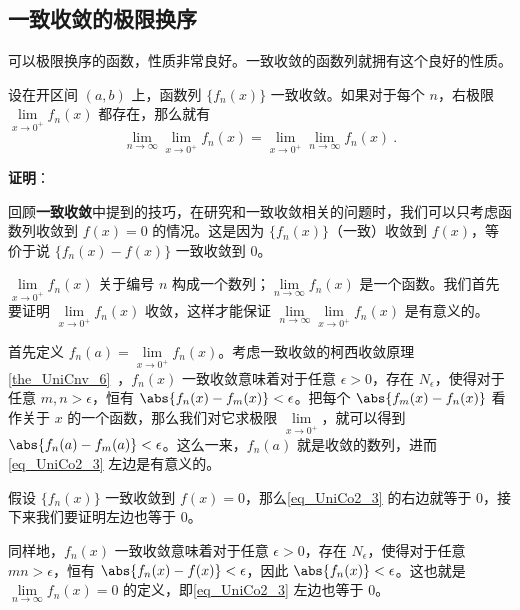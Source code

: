 \subsection{一致收敛的极限换序}

可以极限换序的函数，性质非常良好。一致收敛的函数列就拥有这个良好的性质。

\begin{theorem}{}\label{the_UniCo2_1}
设在开区间 $(a, b)$ 上，函数列 $\{f_n(x)\}$ 一致收敛。如果对于每个 $n$，右极限 $\lim\limits_{x\to 0^+}f_n(x)$ 都存在，那么就有
\begin{equation}\label{eq_UniCo2_3}
\lim\limits_{n\to\infty}\lim\limits_{x\to 0^+}f_n(x)=\lim\limits_{x\to 0^+}\lim\limits_{n\to\infty}f_n(x)~.
\end{equation}
\end{theorem}

\textbf{证明}：

回顾\textbf{一致收敛}中提到的技巧，在研究和一致收敛相关的问题时，我们可以只考虑函数列收敛到 $f(x)=0$ 的情况。这是因为 $\{f_n(x)\}$（一致）收敛到 $f(x)$，等价于说 $\{f_n(x)-f(x)\}$ 一致收敛到 $0$。

$\lim\limits_{x\to 0^+}f_n(x)$ 关于编号 $n$ 构成一个数列；$\lim\limits_{n\to\infty}f_n(x)$ 是一个函数。我们首先要证明 $\lim\limits_{x\to 0^+}f_n(x)$ 收敛，这样才能保证 $\lim\limits_{n\to\infty}\lim\limits_{x\to 0^+}f_n(x)$ 是有意义的。

首先定义 $f_n(a)=\lim\limits_{x\to 0^+}f_n(x)$。考虑一致收敛的柯西收敛原理\autoref{the_UniCnv_6}~，$f_n(x)$ 一致收敛意味着对于任意 $\epsilon>0$，存在 $N_\epsilon$，使得对于任意 $m, n>\epsilon$，恒有 $\abs{f_n(x)-f_m(x)}<\epsilon$。把每个 $\abs{f_m(x)-f_n(x)}$ 看作关于 $x$ 的一个函数，那么我们对它求极限 $\lim\limits_{x\to 0^+}$，就可以得到 $\abs{f_n(a)-f_m(a)}<\epsilon$。这么一来，$f_n(a)$ 就是收敛的数列，进而\autoref{eq_UniCo2_3} 左边是有意义的。

假设 $\{f_n(x)\}$ 一致收敛到 $f(x)=0$，那么\autoref{eq_UniCo2_3} 的右边就等于 $0$，接下来我们要证明左边也等于 $0$。

同样地，$f_n(x)$ 一致收敛意味着对于任意 $\epsilon>0$，存在 $N_\epsilon$，使得对于任意 $mn>\epsilon$，恒有 $\abs{f_n(x)-f(x)}<\epsilon$，因此 $\abs{f_n(x)}<\epsilon$。这也就是 $\lim\limits_{n\to\infty}f_n(x)=0$ 的定义，即\autoref{eq_UniCo2_3} 左边也等于 $0$。


